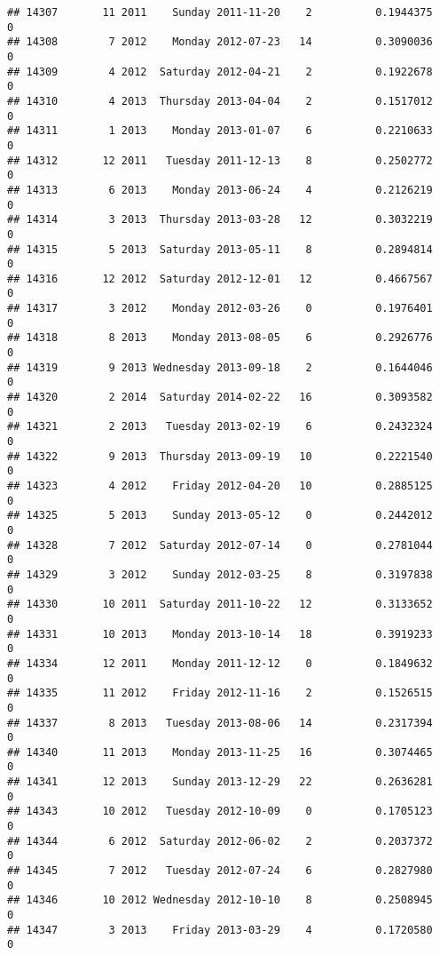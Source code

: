 \documentclass[
]{article}
\begin{document}
\begin{verbatim}
## 14307       11 2011    Sunday 2011-11-20    2          0.1944375             0
## 14308        7 2012    Monday 2012-07-23   14          0.3090036             0
## 14309        4 2012  Saturday 2012-04-21    2          0.1922678             0
## 14310        4 2013  Thursday 2013-04-04    2          0.1517012             0
## 14311        1 2013    Monday 2013-01-07    6          0.2210633             0
## 14312       12 2011   Tuesday 2011-12-13    8          0.2502772             0
## 14313        6 2013    Monday 2013-06-24    4          0.2126219             0
## 14314        3 2013  Thursday 2013-03-28   12          0.3032219             0
## 14315        5 2013  Saturday 2013-05-11    8          0.2894814             0
## 14316       12 2012  Saturday 2012-12-01   12          0.4667567             0
## 14317        3 2012    Monday 2012-03-26    0          0.1976401             0
## 14318        8 2013    Monday 2013-08-05    6          0.2926776             0
## 14319        9 2013 Wednesday 2013-09-18    2          0.1644046             0
## 14320        2 2014  Saturday 2014-02-22   16          0.3093582             0
## 14321        2 2013   Tuesday 2013-02-19    6          0.2432324             0
## 14322        9 2013  Thursday 2013-09-19   10          0.2221540             0
## 14323        4 2012    Friday 2012-04-20   10          0.2885125             0
## 14325        5 2013    Sunday 2013-05-12    0          0.2442012             0
## 14328        7 2012  Saturday 2012-07-14    0          0.2781044             0
## 14329        3 2012    Sunday 2012-03-25    8          0.3197838             0
## 14330       10 2011  Saturday 2011-10-22   12          0.3133652             0
## 14331       10 2013    Monday 2013-10-14   18          0.3919233             0
## 14334       12 2011    Monday 2011-12-12    0          0.1849632             0
## 14335       11 2012    Friday 2012-11-16    2          0.1526515             0
## 14337        8 2013   Tuesday 2013-08-06   14          0.2317394             0
## 14340       11 2013    Monday 2013-11-25   16          0.3074465             0
## 14341       12 2013    Sunday 2013-12-29   22          0.2636281             0
## 14343       10 2012   Tuesday 2012-10-09    0          0.1705123             0
## 14344        6 2012  Saturday 2012-06-02    2          0.2037372             0
## 14345        7 2012   Tuesday 2012-07-24    6          0.2827980             0
## 14346       10 2012 Wednesday 2012-10-10    8          0.2508945             0
## 14347        3 2013    Friday 2013-03-29    4          0.1720580             0

\end{verbatim}
\end{document}
